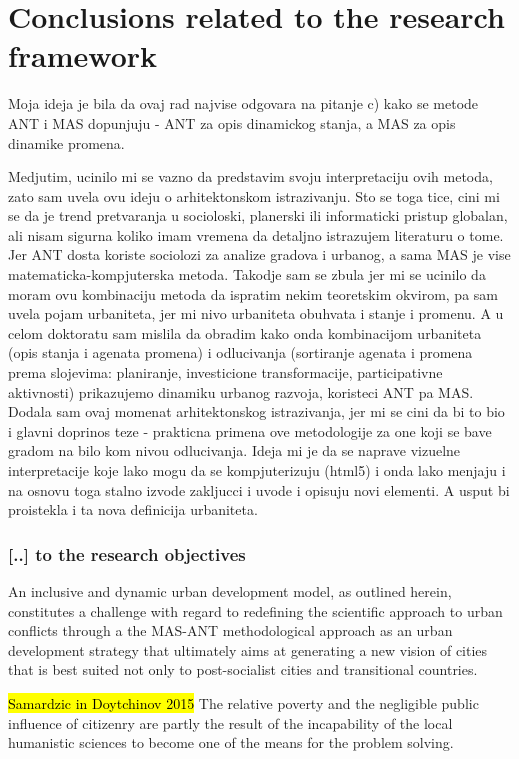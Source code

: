 \documentclass[11pt]{report}
\begin{document}
\section{Conclusions related to the research framework}

Moja ideja je bila da ovaj rad najvise odgovara na pitanje c) kako se metode ANT i MAS dopunjuju - ANT za opis dinamickog stanja, a MAS za opis dinamike promena.

Medjutim, ucinilo mi se vazno da predstavim svoju interpretaciju ovih metoda, zato sam uvela ovu ideju o arhitektonskom istrazivanju. Sto se toga tice, cini mi se da je trend pretvaranja u socioloski, planerski ili informaticki pristup globalan, ali nisam sigurna koliko imam vremena da detaljno istrazujem literaturu o tome. Jer ANT dosta koriste sociolozi za analize gradova i urbanog, a sama MAS je vise matematicka-kompjuterska metoda. Takodje sam se zbula jer mi se ucinilo da moram ovu kombinaciju metoda da ispratim nekim teoretskim okvirom, pa sam uvela pojam urbaniteta, jer mi nivo urbaniteta obuhvata i stanje i promenu. A u celom doktoratu sam mislila da obradim kako onda kombinacijom urbaniteta (opis stanja i agenata promena) i odlucivanja (sortiranje agenata i promena prema slojevima: planiranje, investicione transformacije, participativne aktivnosti) prikazujemo dinamiku urbanog razvoja, koristeci  ANT pa MAS. Dodala sam ovaj momenat arhitektonskog istrazivanja, jer mi se cini da bi to bio i glavni doprinos teze - prakticna primena ove metodologije za one koji se bave gradom na bilo kom nivou odlucivanja. Ideja mi je da se naprave vizuelne interpretacije koje lako mogu da se kompjuterizuju (html5) i onda lako menjaju i na osnovu toga stalno izvode zakljucci i uvode i opisuju novi elementi.
A usput bi proistekla i ta nova definicija urbaniteta.

\subsubsection{[..] to the research objectives}

An inclusive and dynamic urban development model, as outlined herein, constitutes a challenge with regard to redefining the scientific approach to urban conflicts through a the MAS-ANT methodological approach as an urban development strategy that ultimately aims at generating a new vision of cities that is best suited not only to post-socialist cities and transitional countries.

\hl{Samardzic in Doytchinov 2015} 
The relative poverty and the negligible public influence of citizenry are partly the result of the incapability of the local
humanistic  sciences  to  become  one  of  the  means  for  the  problem  solving. 
\end{document}

